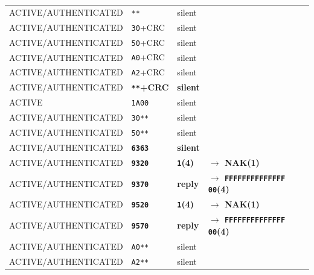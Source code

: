 \begin{longtable}{l l l l}
ACTIVE/AUTHENTICATED & \texttt{**}                         & silent          &                                             \\
ACTIVE/AUTHENTICATED & \texttt{30}+CRC                     & silent          &                                             \\
ACTIVE/AUTHENTICATED & \texttt{50}+CRC                     & silent          &                                             \\
ACTIVE/AUTHENTICATED & \texttt{A0}+CRC                     & silent          &                                             \\
ACTIVE/AUTHENTICATED & \texttt{A2}+CRC                     & silent          &                                             \\
ACTIVE/AUTHENTICATED & \textbf{\texttt{**}+CRC}            & \textbf{silent} &                                             \\
ACTIVE               & \texttt{1A00}                       & silent          &                                             \\
ACTIVE/AUTHENTICATED & \texttt{30**}                       & silent          &                                             \\
ACTIVE/AUTHENTICATED & \texttt{50**}                       & silent          &                                             \\
ACTIVE/AUTHENTICATED & \textbf{\texttt{6363}}              & \textbf{silent} &                                             \\
ACTIVE/AUTHENTICATED & \textbf{\texttt{9320}}              & \textbf{\texttt{1}(4)}   & \textbf{$\rightarrow$ NAK(1)}               \\
ACTIVE/AUTHENTICATED & \textbf{\texttt{9370}}              & \textbf{reply}  & \textbf{$\rightarrow$ \texttt{FFFFFFFFFFFFFF 00}(4)} \\
ACTIVE/AUTHENTICATED & \textbf{\texttt{9520}}              & \textbf{\texttt{1}(4)}   & \textbf{$\rightarrow$ NAK(1)}               \\
ACTIVE/AUTHENTICATED & \textbf{\texttt{9570}}              & \textbf{reply}  & \textbf{$\rightarrow$ \texttt{FFFFFFFFFFFFFF 00}(4)} \\
ACTIVE/AUTHENTICATED & \texttt{A0**}                       & silent          &                                             \\
ACTIVE/AUTHENTICATED & \texttt{A2**}                       & silent          &                                             \\

\end{longtable}

